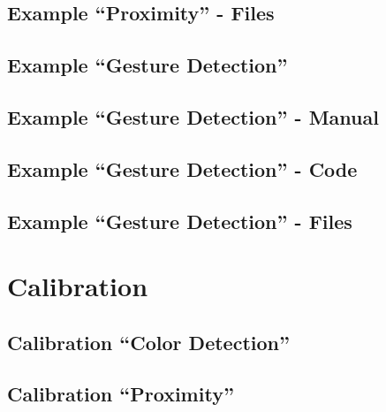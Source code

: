 {
    \label{TestAPDS9960Proximity}
}


\subsection{Example ``Proximity'' - Files}


\subsection{Example ``Gesture Detection''}


\subsection{Example ``Gesture Detection'' - Manual}


\subsection{Example ``Gesture Detection'' - Code}



{
    \label{TestAPDS9960Gesture}
}




\subsection{Example ``Gesture Detection'' - Files}




\section{Calibration}

\subsection{Calibration ``Color Detection''}


\subsection{Calibration ``Proximity''}

